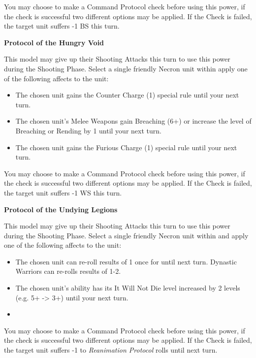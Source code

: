 You may choose to make a Command Protocol check before using this power, if the check is successful two different options may be applied. If the Check is failed, the target unit suffers -1 BS this turn.

\textbf{Protocol of the Hungry Void}

This model may give up their Shooting Attacks this turn to use this power during the Shooting Phase. Select a single friendly Necron unit within  apply one of the following affects to the unit:

\begin{itemize}
	\itemsep 0pt
	\item The chosen unit gains the Counter Charge (1) special rule until your next turn.
	\item The chosen unit's Melee Weapons gain Breaching (6+) or increase the level of Breaching or Rending by 1 until your next turn.
	\item The chosen unit gains the Furious Charge (1) special rule until your next turn.
\end{itemize}

You may choose to make a Command Protocol check before using this power, if the check is successful two different options may be applied. If the Check is failed, the target unit suffers -1 WS this turn.

\textbf{Protocol of the Undying Legions}

This model may give up their Shooting Attacks this turn to use this power during the Shooting Phase. Select a single friendly Necron unit within  and apply one of the following affects to the unit:

\begin{itemize}
	\itemsep 0pt
	\item The chosen unit can re-roll results of 1 once for  until next turn. Dynastic Warriors can re-rolls results of 1-2.
	\item The chosen unit's  ability has its It Will Not Die level increased by 2 levels (e.g. 5+ -> 3+) until  your next turn.
	\item 
\end{itemize}

You may choose to make a Command Protocol check before using this power, if the check is successful two different options may be applied. If the Check is failed, the target unit suffers -1 to \textit{Reanimation Protocol} rolls until next turn.

